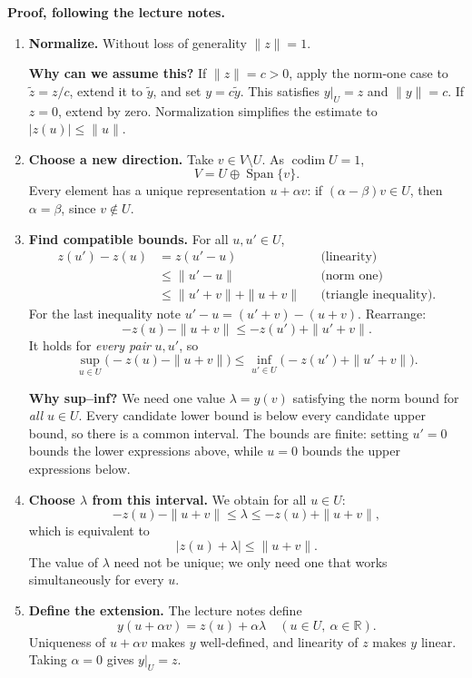 \documentclass[11pt,a4paper]{article}
\newenvironment{proofsteps}{\begin{enumerate}\setlength{\itemsep}{4pt}}{\end{enumerate}}
\begin{document}
\textbf{Proof, following the lecture notes.}
\begin{proofsteps}
\item \textbf{Normalize.} Without loss of generality \(\|z\|=1\).
\begin{personalnote}
\textbf{Why can we assume this?} If \(\|z\|=c>0\), apply the norm-one case to \(\widetilde z=z/c\), extend it to \(\widetilde y\), and set \(y=c\widetilde y\). This satisfies \(y|_U=z\) and \(\|y\|=c\). If \(z=0\), extend by zero. Normalization simplifies the estimate to \(|z(u)|\leq\|u\|\).
\end{personalnote}

\item \textbf{Choose a new direction.} Take \(v\in V\setminus U\). As \(\operatorname{codim}U=1\),
\[
 V=U\oplus\operatorname{Span}\{v\}.
\]
Every element has a unique representation \(u+\alpha v\): if \((\alpha-\beta)v\in U\), then \(\alpha=\beta\), since \(v\notin U\).

\item \textbf{Find compatible bounds.} For all \(u,u'\in U\),
\[
 \begin{aligned}
 z(u')-z(u)&=z(u'-u) &&\text{(linearity)}\\
 &\leq\|u'-u\| &&\text{(norm one)}\\
 &\leq\|u'+v\|+\|u+v\| &&\text{(triangle inequality).}
 \end{aligned}
\]
For the last inequality note \(u'-u=(u'+v)-(u+v)\).
Rearrange:
\[
 -z(u)-\|u+v\|\leq-z(u')+\|u'+v\|.
\]
It holds for \emph{every pair} \(u,u'\), so
\[
 \boxed{\sup_{u\in U}\bigl(-z(u)-\|u+v\|\bigr)
 \leq\inf_{u'\in U}\bigl(-z(u')+\|u'+v\|\bigr).}
\]
\begin{personalnote}
\textbf{Why sup--inf?} We need one value \(\lambda=y(v)\) satisfying the norm bound for \emph{all} \(u\in U\). Every candidate lower bound is below every candidate upper bound, so there is a common interval. The bounds are finite: setting \(u'=0\) bounds the lower expressions above, while \(u=0\) bounds the upper expressions below.
\end{personalnote}

\item \textbf{Choose \(\lambda\) from this interval.} We obtain for all \(u\in U\):
\[
 -z(u)-\|u+v\|\leq\lambda\leq-z(u)+\|u+v\|,
\]
which is equivalent to
\[
 \boxed{|z(u)+\lambda|\leq\|u+v\|.}
\]
The value of \(\lambda\) need not be unique; we only need one that works simultaneously for every \(u\).

\item \textbf{Define the extension.} The lecture notes define
\[
 \boxed{y(u+\alpha v)=z(u)+\alpha\lambda
 \quad(u\in U,\ \alpha\in\mathbb R).}
\]
Uniqueness of \(u+\alpha v\) makes \(y\) well-defined, and linearity of \(z\) makes \(y\) linear. Taking \(\alpha=0\) gives \(y|_U=z\).


\end{proofsteps}
\end{document}
